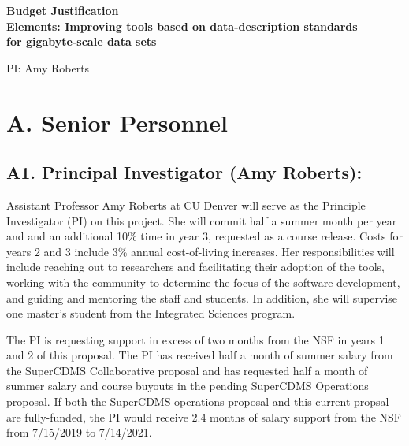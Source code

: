 \documentclass[11pt,oneside]{memoir}
\newcommand{\CDMS}{{\small CDMS}}
\begin{document}
\mainmatter
\pagestyle{bodystyle}

\begin{center}
\textbf{{\Large Budget Justification}} \\
\textbf{{Elements: Improving tools based on data-description standards \\ for gigabyte-scale data sets}}
\centerline{PI: Amy Roberts}
\end{center}


\section*{A. Senior Personnel}

\subsection*{A1. Principal Investigator (Amy Roberts):}

Assistant Professor Amy Roberts at CU Denver will serve as the Principle Investigator (PI) on this project.  She will commit half a summer month per year and and an additional 10\% time in year 3, requested as a course release. Costs for years 2 and 3 include 3\% annual cost-of-living increases. Her responsibilities will include reaching out to researchers and facilitating their adoption of the tools, working with the community to determine the focus of the software development, and guiding and mentoring the staff and students.  In addition, she will supervise one master's student from the Integrated Sciences program.


The PI is requesting support in excess of two months from the NSF in years 1 and 2 of this proposal.  The PI has received half a month of summer salary from the SuperCDMS Collaborative proposal and has requested half a month of summer salary and course buyouts in the pending SuperCDMS Operations proposal.  If both the SuperCDMS operations proposal and this current propsal are fully-funded, the PI would receive 2.4 months of salary support from the NSF from 7/15/2019 to 7/14/2021.  
\end{document}
